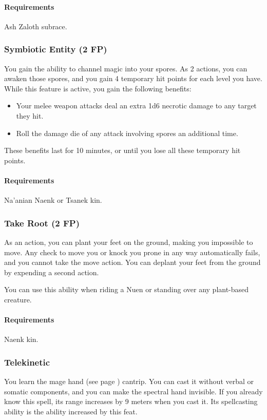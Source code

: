     \paragraph{Requirements} Ash Zaloth subrace.
\subsubsection{Symbiotic Entity (2 FP)} \label{feat::symbioticentity}
    You gain the ability to channel magic into your spores.
    As 2 actions, you can awaken those spores, and you gain 4 temporary hit points for each level you have.
    While this feature is active, you gain the following benefits:
    \begin{itemize}
        \item Your melee weapon attacks deal an extra 1d6 necrotic damage to any target they hit.
        \item Roll the damage die of any attack involving spores an additional time.
    \end{itemize}
    These benefits last for 10 minutes, or until you lose all these temporary hit points.
    \paragraph{Requirements} Na'anian Naenk or Tsanek kin.
\subsubsection{Take Root (2 FP)} \label{feat::takeroot}
    As an action, you can plant your feet on the ground, making you impossible to move.
    Any check to move you or knock you prone in any way automatically fails, and you cannot take the move action.
    You can deplant your feet from the ground by expending a second action.

    You can use this ability when riding a Nuen or standing over any plant-based creature.
    \paragraph{Requirements} Naenk kin.
\subsubsection{Telekinetic} \label{feat::telekinetic}
    You learn the mage hand (see page \pageref{spell:magehand}) cantrip.
    You can cast it without verbal or somatic components, and you can make the spectral hand invisible.
    If you already know this spell, its range increases by 9 meters when you cast it.
    Its spellcasting ability is the ability increased by this feat.

